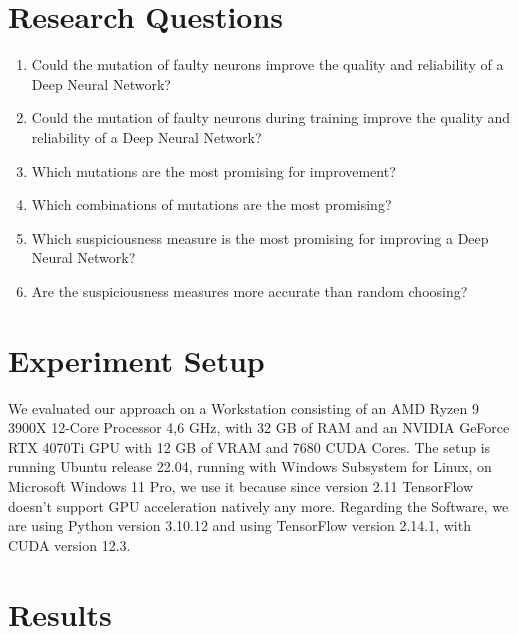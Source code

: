 \section{Research Questions}\label{sec:research-questions}
\begin{enumerate}
    \renewcommand{\labelenumi}{RQ\theenumi}
    \item Could the mutation of faulty neurons improve the quality and reliability of a Deep Neural Network?
    \item Could the mutation of faulty neurons during training improve the quality and reliability of a Deep Neural Network?
    \item Which mutations are the most promising for improvement?
    \item Which combinations of mutations are the most promising?
    \item Which suspiciousness measure is the most promising for improving a Deep Neural Network?
    \item Are the suspiciousness measures more accurate than random choosing?
\end{enumerate}
\section{Experiment Setup}\label{sec:experiment-setup}
We evaluated our approach on a Workstation consisting of an AMD Ryzen 9 3900X 12-Core Processor 4,6 GHz, with 32 GB of RAM and an NVIDIA GeForce RTX 4070Ti GPU with 12 GB of VRAM and 7680 CUDA Cores.
The setup is running Ubuntu release 22.04, running with Windows Subsystem for Linux, on Microsoft Windows 11 Pro, we use it because since version 2.11\cite{noauthor_build_2023} TensorFlow doesn't support GPU acceleration natively any more.
Regarding the Software, we are using Python version 3.10.12 and using TensorFlow version 2.14.1, with CUDA version 12.3.
\section{Results}\label{sec:results}